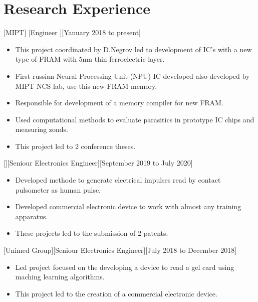 \documentclass{article}
\begin{document}
\section{Research Experience}

[MIPT]
[Engineer ][Yanuary 2018 to present]

\begin{itemize}
\item This project coordinated by D.Negrov led to development of IC's with a new type of FRAM with 5nm thin ferroelectric layer.
\item First russian Neural Processing Unit (NPU) IC developed also developed by MIPT NCS lab, use this new FRAM memory. 
\item Responsible for development of a memory compiler for new FRAM.
\item Used computational methods to evaluate parasitics in prototype IC chips and measuring zonds.
\item This project led to 2 conference theses.
\end{itemize}


[][Seniour Electronics Engineer][September 2019 to July 2020]

\begin{itemize}
\item Developed methode to generate electrical impulses read by contact pulsometer as human pulse.
\item Developed commercial electronic device to work with almost any training apparatus. 
\item These projects led to the submission of 2 patents.
\end{itemize}

[Unimed Group][Seniour Electronics Engineer][July 2018 to December 2018]

\begin{itemize}
\item Led project focused on the developing a device to read a gel card using maching learning algorithms.
\item This project led to the creation of a commercial electronic device.
\end{itemize}
\end{document}

